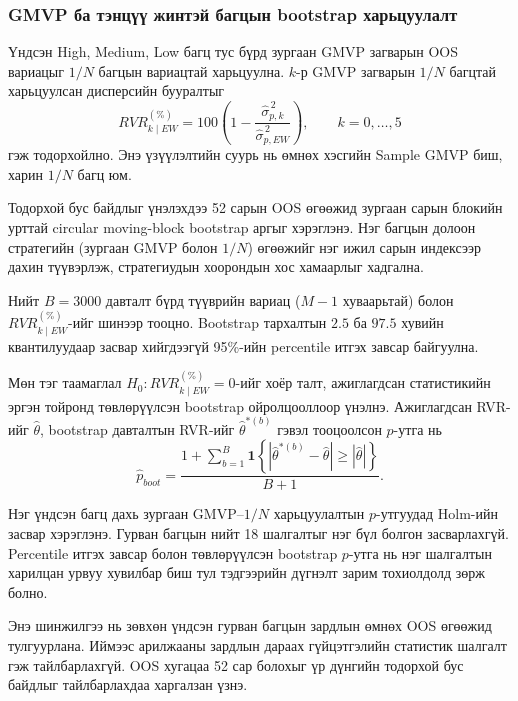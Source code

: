 \subsubsection{GMVP ба тэнцүү жинтэй багцын
	bootstrap харьцуулалт}
\label{subsubsec:bootstrap_equal_weight}

Үндсэн High, Medium, Low багц тус бүрд
зургаан GMVP загварын OOS вариацыг
$1/N$ багцын вариацтай харьцуулна.
$k$-р GMVP загварын $1/N$ багцтай
харьцуулсан дисперсийн бууралтыг
\[
RVR_{k\mid EW}^{(\%)}
=100\left(
1-\frac{\widehat{\sigma}_{p,k}^{\,2}}
{\widehat{\sigma}_{p,EW}^{\,2}}
\right),\qquad k=0,\ldots,5
\]
гэж тодорхойлно. Энэ үзүүлэлтийн
суурь нь өмнөх хэсгийн Sample GMVP
биш, харин $1/N$ багц юм.

Тодорхой бус байдлыг үнэлэхдээ
52 сарын OOS өгөөжид зургаан сарын
блокийн урттай circular moving-block
bootstrap аргыг хэрэглэнэ. Нэг багцын
долоон стратегийн (зургаан GMVP болон
$1/N$) өгөөжийг нэг ижил сарын
индексээр дахин түүвэрлэж, стратегиудын
хоорондын хос хамаарлыг хадгална.

Нийт $B=3000$ давталт бүрд түүврийн
вариац ($M-1$ хуваарьтай) болон
$RVR_{k\mid EW}^{(\%)}$-ийг шинээр
тооцно. Bootstrap тархалтын $2.5$ ба
$97.5$ хувийн квантилуудаар засвар
хийгдээгүй 95\%-ийн percentile итгэх
завсар байгуулна.

Мөн тэг таамаглал
$H_0:RVR_{k\mid EW}^{(\%)}=0$-ийг
хоёр талт, ажиглагдсан статистикийн
эргэн тойронд төвлөрүүлсэн bootstrap
ойролцооллоор үнэлнэ. Ажиглагдсан
RVR-ийг $\widehat{\theta}$, bootstrap
давталтын RVR-ийг $\widehat{\theta}^{*(b)}$
гэвэл тооцоолсон $p$-утга нь
\[
\widehat{p}_{boot}
=\frac{1+\sum_{b=1}^{B}
	\boldsymbol{1}\!\left\{
	\left|\widehat{\theta}^{*(b)}-\widehat{\theta}\right|
	\geq\left|\widehat{\theta}\right|
	\right\}}{B+1}.
\]

Нэг үндсэн багц дахь зургаан GMVP--$1/N$
харьцуулалтын $p$-утгуудад Holm-ийн
засвар хэрэглэнэ. Гурван багцын
нийт 18 шалгалтыг нэг бүл болгон
засварлахгүй. Percentile итгэх завсар
болон төвлөрүүлсэн bootstrap $p$-утга
нь нэг шалгалтын харилцан урвуу
хувилбар биш тул тэдгээрийн дүгнэлт
зарим тохиолдолд зөрж болно.

Энэ шинжилгээ нь зөвхөн үндсэн гурван
багцын зардлын өмнөх OOS өгөөжид
тулгуурлана. Иймээс арилжааны зардлын
дараах гүйцэтгэлийн статистик шалгалт
гэж тайлбарлахгүй. OOS хугацаа 52 сар
болохыг үр дүнгийн тодорхой бус байдлыг
тайлбарлахдаа харгалзан үзнэ.